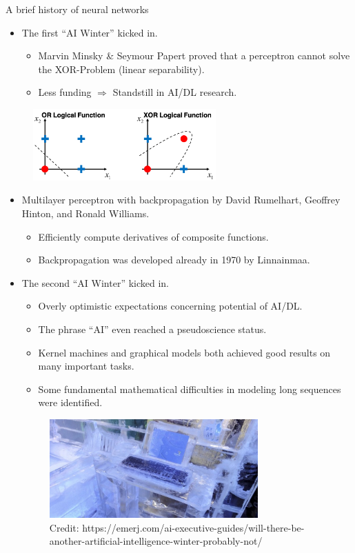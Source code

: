 \begin{vbframe}{A brief history of neural networks}
\begin{itemize}
\item {} The first \enquote{AI Winter} kicked in.
\begin{itemize}
\item Marvin Minsky \& Seymour Papert proved that a perceptron cannot solve the XOR-Problem (linear separability).
\item Less funding $\Rightarrow$ Standstill in AI/DL research.
\end{itemize}
\end{itemize}
\begin{figure}
\includegraphics[width=7cm]{figure/orvsxor.png}
\end{figure}
\begin{itemize}
\item {} Multilayer perceptron with backpropagation by David Rumelhart, Geoffrey Hinton, and Ronald Williams.
\begin{itemize}
\item Efficiently compute derivatives of composite functions.
\item Backpropagation was developed already in 1970 by Linnainmaa.
\end{itemize}
\framebreak

\item {} The second \enquote{AI Winter} kicked in.

\begin{itemize}
\footnotesize\item Overly optimistic expectations concerning potential of AI/DL.
\footnotesize\item The phrase \enquote{AI} even reached a pseudoscience status.
\footnotesize\item Kernel machines and graphical models both achieved good results on many important tasks.
\footnotesize\item Some fundamental mathematical difficulties in modeling long sequences were identified.
\end{itemize}
\begin{figure}
\includegraphics[width=8cm]{figure/ai_winter.jpg}
\\
\tiny{Credit: https://emerj.com/ai-executive-guides/will-there-be-another-artificial-intelligence-winter-probably-not/}
\end{figure}
\framebreak


\end{itemize}
\end{vbframe}
